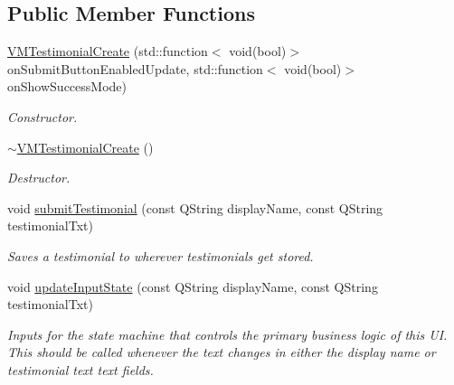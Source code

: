 \subsection*{Public Member Functions}
\begin{DoxyCompactItemize}
\item 
\mbox{\hyperlink{class_v_m_testimonial_create_a470df2e99d49a1e312a4cacf7bb5c1c5}{V\+M\+Testimonial\+Create}} (std\+::function$<$ void(bool)$>$ on\+Submit\+Button\+Enabled\+Update, std\+::function$<$ void(bool)$>$ on\+Show\+Success\+Mode)
\begin{DoxyCompactList}\small\item\em Constructor. \end{DoxyCompactList}\item 
\mbox{\hyperlink{class_v_m_testimonial_create_a1031e0c42f0e86df90626123ebfceb8e}{$\sim$\+V\+M\+Testimonial\+Create}} ()
\begin{DoxyCompactList}\small\item\em Destructor. \end{DoxyCompactList}\item 
void \mbox{\hyperlink{class_v_m_testimonial_create_add444a0cb13f978e1cef24b45283bf92}{submit\+Testimonial}} (const Q\+String display\+Name, const Q\+String testimonial\+Txt)
\begin{DoxyCompactList}\small\item\em Saves a testimonial to wherever testimonials get stored. \end{DoxyCompactList}\item 
void \mbox{\hyperlink{class_v_m_testimonial_create_a9f9c3ff96e890ff6a5e3b9d05824df27}{update\+Input\+State}} (const Q\+String display\+Name, const Q\+String testimonial\+Txt)
\begin{DoxyCompactList}\small\item\em Inputs for the state machine that controls the primary business logic of this UI. This should be called whenever the text changes in either the display name or testimonial text text fields. \end{DoxyCompactList}\end{DoxyCompactItemize}
